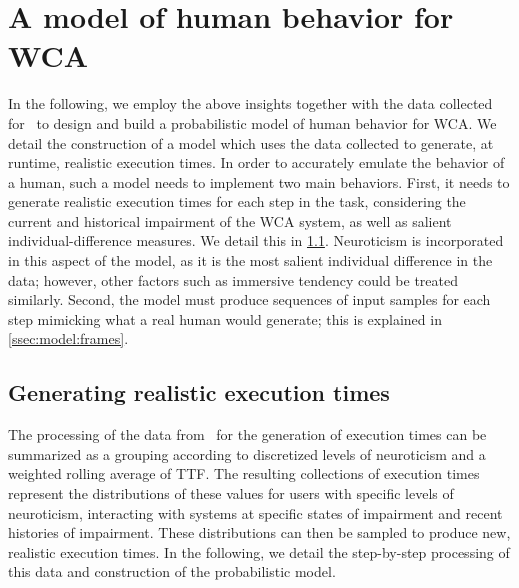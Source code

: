 \section{A model of human behavior for \gls{WCA}}\label{sec:model}

In the following, we employ the above insights together with the data collected for~\cite{olguinmunoz2021impact} to design and build a probabilistic model of human behavior for \gls{WCA}.
We detail the construction of a model which uses the data collected to generate, at runtime, realistic execution times. 
In order to accurately emulate the behavior of a human, such a model needs to implement two main behaviors.
First, it needs to generate realistic execution times for each step in the task, considering the current and historical impairment of the \gls{WCA} system, as well as salient individual-difference measures.
We detail this in \cref{ssec:model:exectimes}.
Neuroticism is incorporated in this aspect of the model, as it is the most salient individual difference in the data;
however, other factors such as immersive tendency could be treated similarly.
Second, the model must produce sequences of input samples for each step mimicking what a real human would generate; this is explained in \cref{ssec:model:frames}. 


\subsection{Generating realistic execution times}\label{ssec:model:exectimes}

The processing of the data from~\cite{olguinmunoz2021impact} for the generation of execution times can be summarized as a grouping according to discretized levels of neuroticism and a weighted rolling average of \gls{TTF}.
The resulting collections of execution times represent the distributions of these values for users with specific levels of neuroticism, interacting with systems at specific states of impairment and recent histories of impairment.
These distributions can then be sampled to produce new, realistic execution times.
In the following, we detail the step-by-step processing of this data and construction of the probabilistic model.

